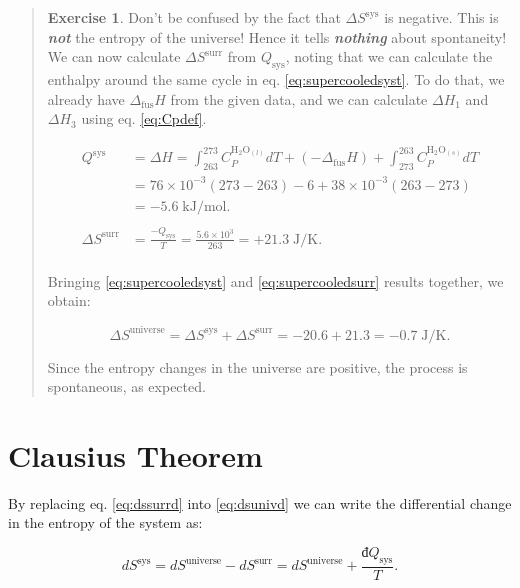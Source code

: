 \documentclass[
  9pt,
]{extbook}
\theoremstyle{definition}
\theoremstyle{definition}
\theoremstyle{definition}
\newtheorem{exercise}{Exercise}[chapter]
\theoremstyle{remark}
\begin{document}
\begin{quote}
\begin{exercise}
Don't be confused by the fact that \(\Delta S^{\text{sys}}\) is negative. This is \textbf{\emph{not}} the entropy of the universe! Hence it tells \textbf{\emph{nothing}} about spontaneity! We can now calculate \(\Delta S^{\text{surr}}\) from \(Q_{\text{sys}}\), noting that we can calculate the enthalpy around the same cycle in eq. \eqref{eq:supercooledsyst}. To do that, we already have \(\Delta_{\mathrm{fus}}H\) from the given data, and we can calculate \(\Delta H_1\) and \(\Delta H_3\) using eq. \eqref{eq:Cpdef}.

\begin{equation}
\begin{aligned}
Q^{\text{sys}} & = \Delta H = \int_{263}^{273} C_P^{\mathrm{H}_2 \mathrm{O}_{(l)}} dT + (-\Delta_{\mathrm{fus}}H) + \int_{273}^{263} C_P^{\mathrm{H}_2 \mathrm{O}_{(s)}}dT \\
& = 76 \times 10^{-3} (273-263) - 6 + 38  \times 10^{-3} (263-273) \\ &= -5.6 \; \text{kJ/mol}. \\
\\
\Delta S^{\text{surr}} & = \frac{-Q_{\text{sys}}}{T}=\frac{5.6 \times 10^3}{263} = + 21.3 \; \text{J/K}. \\
\end{aligned}
\label{eq:supercooledsurr}
\end{equation}

Bringing \eqref{eq:supercooledsyst} and \eqref{eq:supercooledsurr} results together, we obtain:

\begin{equation}
\Delta S^{\text{universe}}=\Delta S^{\text{sys}} + \Delta S^{\text{surr}} =  -20.6+21.3=-0.7 \; \text{J/K}.
\label{eq:supercooledfinal}
\end{equation}

Since the entropy changes in the universe are positive, the process is spontaneous, as expected.
\end{exercise}
\end{quote}

\hypertarget{spontS}{%
\section{Clausius Theorem}\label{spontS}}

By replacing eq. \eqref{eq:dssurrd} into \eqref{eq:dsunivd} we can write the differential change in the entropy of the system as:

\begin{equation}
d S^{\mathrm{sys}} = d S^{\mathrm{universe}} - d S^{\mathrm{surr}} = d S^{\mathrm{universe}} + \frac{đQ_{\text{sys}}}{T}.
\label{eq:dssysd}
\end{equation}
\end{document}
